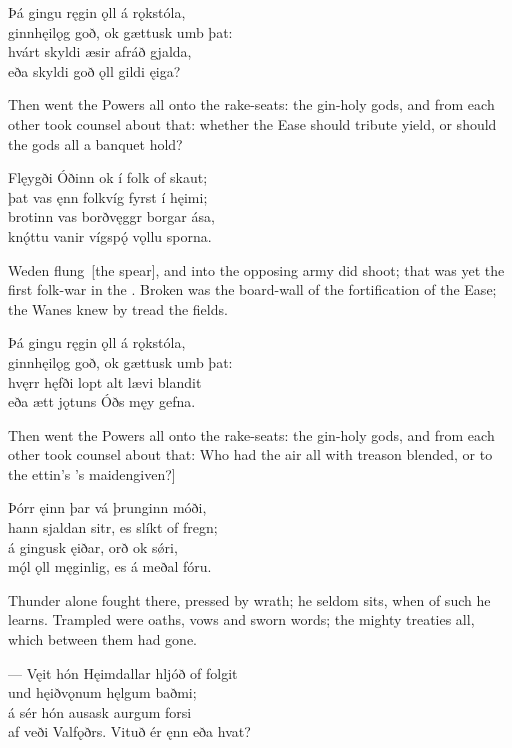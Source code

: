 \bva Þá gingu ręgin ǫll \hld á rǫkstóla, \\%
ginnhęilǫg goð, \hld ok gættusk umb þat: \\%
hvárt skyldi æsir \hld afráð gjalda, \\%
eða skyldi goð ǫll \hld gildi ęiga?\eva

\bvb Then went the Powers all onto the rake-seats: the gin-holy gods, and from each other took counsel about that: whether the Ease should tribute yield, or should the gods all a banquet hold?\evb

\bva Flęygði Óðinn \hld ok í folk of skaut; \\%
þat vas ęnn folkvíg \hld fyrst í hęimi; \\%
brotinn vas borðvęggr \hld borgar ása, \\%
knǫ́ttu vanir vígspǫ́ \hld vǫllu sporna.\eva

\bvb Weden flung [the spear], and into the opposing army did shoot; that was yet the first folk-war in the . Broken was the board-wall of the fortification of the Ease; the Wanes knew by  tread the fields.\footnotemark[1]\evb
{}

\bva Þá gingu ręgin ǫll \hld á rǫkstóla, \\%
ginnhęilǫg goð, \hld ok gættusk umb þat: \\%
hvęrr hęfði lopt alt \hld lævi blandit \\%
eða ætt jǫtuns \hld Óðs męy gefna.\eva

\bvb Then went the Powers all onto the rake-seats: the gin-holy gods, and from each other took counsel about that: Who had the air all with treason blended, or to the ettin’s  ’s maiden\footnotemark[1] given?]\evb
{}

\bva Þórr ęinn þar vá \hld þrunginn móði, \\%
hann sjaldan sitr, \hld es slíkt of fregn; \\%
á gingusk ęiðar, \hld orð ok sǿri, \\%
mǫ́l ǫll męginlig, \hld es á meðal fóru.\eva

\bvb Thunder alone fought there, pressed by wrath; he seldom sits, when of such he learns. Trampled were oaths, vows and sworn words; the mighty treaties all, which between them had gone.\evb

\bva — Vęit hón Hęimdallar \hld hljóð of folgit \\%
und hęiðvǫnum \hld hęlgum baðmi; \\%
á sér hón ausask \hld aurgum forsi \\%
af veði Valfǫðrs. \hld Vituð ér ęnn eða hvat?\eva

